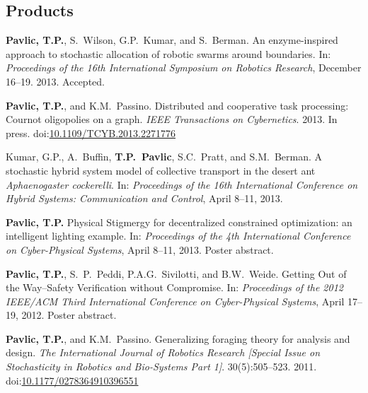 \documentclass[svgnames,11pt]{article}
\newcommand\doilink[1]{\href{http://dx.doi.org/#1}{#1}}
\newcommand\doi[1]{doi:\doilink{#1}}
\begin{document}
\subsection{Products}

\begin{bibenum}[itemsep=5pt]

    \item \textbf{Pavlic, T.P.}, S.~Wilson, G.P.~Kumar, and S.~Berman.
        An enzyme-inspired approach to stochastic allocation of robotic
        swarms around boundaries. In: \emph{Proceedings of the 16th
        International Symposium on Robotics Research},
        December 16--19. 2013. Accepted.

    \item \textbf{Pavlic, T.P.}, and K.M.~Passino. Distributed and
        cooperative task processing: Cournot oligopolies on a graph.
        \emph{IEEE Transactions on Cybernetics}. 2013. In press.
        \doi{10.1109/TCYB.2013.2271776}

    \item Kumar, G.P., A.~Buffin, \textbf{T.P.~Pavlic}, S.C.~Pratt, and
        S.M.~Berman. A stochastic hybrid system model of collective
        transport in the desert ant \emph{Aphaenogaster cockerelli}. In:
        \emph{Proceedings of the 16th International Conference on Hybrid
        Systems: Communication and Control}, April 8--11,
        2013.

    \item \textbf{Pavlic, T.P.} Physical Stigmergy for decentralized
        constrained optimization: an intelligent lighting example. In:
        \emph{Proceedings of the 4th International Conference on
        Cyber-Physical Systems}, April 8--11, 2013.
        Poster abstract.

    \item \textbf{Pavlic, T.P.}, S.~P.~Peddi, P.A.G.~Sivilotti, and B.W.~Weide.
        Getting Out of the Way--Safety Verification without Compromise.
        In: \emph{Proceedings of the 2012 IEEE/ACM Third International
        Conference on Cyber-Physical Systems}, April
        17--19, 2012. Poster abstract.

    \item \textbf{Pavlic, T.P.}, and K.M.~Passino. Generalizing foraging theory
        for analysis and design. \emph{The International Journal of
        Robotics Research [Special Issue on Stochasticity in Robotics
        and Bio-Systems Part 1]}. 30(5):505--523. 2011.
        \doi{10.1177/0278364910396551}


\end{bibenum}
\end{document}
